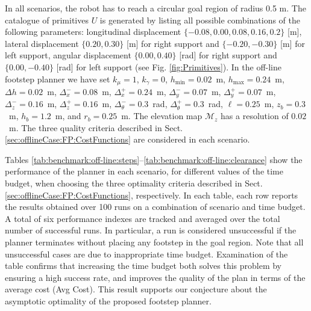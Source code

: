 In all scenarios, the robot has to reach a circular goal region of radius 0.5 m.
The catalogue of primitives $U$ is generated by listing all possible combinations of the following parameters: longitudinal displacement $\{-0.08,0.00,0.08,0.16,0.2\}$ [m], lateral displacement $\{0.20,0.30\}$ [m] for right support and $\{-0.20,-0.30\}$ [m] for left support, angular displacement $\{0.00,0.40\}$ [rad] for right support and $\{0.00,-0.40\}$ [rad] for left support (see Fig. \ref{fig:Primitives}).
In the off-line footstep planner we have set $k_{\mu} = 1$, $k_{\gamma} = 0$, $h_{\min} = 0.02$~m, $h_{\max} = 0.24$~m, $\Delta h = 0.02$~m, $\Delta_x^- = 0.08$~m, $\Delta_x^+ = 0.24$~m, $\Delta_y^-=0.07$~m, $\Delta_y^+=0.07$~m, $\Delta_z^-=0.16$~m, $\Delta_z^+=0.16$~m, $\Delta_\theta^-=0.3$~rad, $\Delta_\theta^+=0.3$~rad, $\ell = 0.25$~m, $z_b=0.3$~m, $h_b=1.2$~m, and $r_b=0.25$~m.
The elevation map $\mathcal{M}_z$ has a resolution of $0.02$~m.
The three quality criteria described in Sect. \ref{sec:offlineCase:FP:CostFunctions} are considered in each scenario.


Tables \ref{tab:benchmark:off-line:steps}--\ref{tab:benchmark:off-line:clearance}
show the performance of the planner in each scenario, for different values of the time budget, when choosing the three optimality criteria described in Sect. \ref{sec:offlineCase:FP:CostFunctions}, respectively.
In each table, each row reports the results obtained over 100 runs on a combination of scenario and time budget. A total of six performance indexes are tracked and averaged over the total number of successful runs.
In particular, a run is considered unsuccessful if the planner terminates without placing any footstep in the goal region.
Note that all unsuccessful cases are due to inappropriate time budget.
Examination of the table confirms that increasing the time budget both solves this problem by ensuring a high success rate, and improves the quality of the plan in terms of the average cost (Avg Cost). 
This result supports our conjecture about the asymptotic optimality of the proposed footstep planner.

